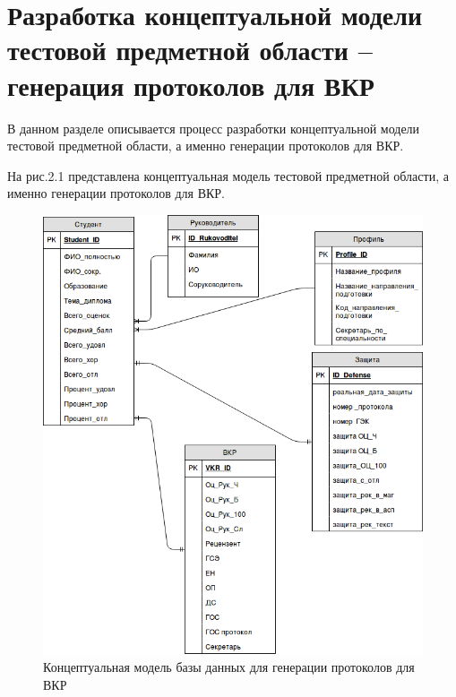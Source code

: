 \chapter{Разработка концептуальной модели тестовой предметной области – генерация протоколов для ВКР}
\label{chapter2}

В данном разделе описывается процесс разработки концептуальной модели тестовой предметной области, а именно генерации протоколов для ВКР.  

На рис.2.1 представлена концептуальная модель тестовой предметной области, а именно генерации протоколов для ВКР. \cite{ud}

\begin{figure}
	\caption{Концептуальная модель базы данных для генерации протоколов для ВКР}
	\centering
	\includegraphics[width=\textwidth]{./ERUIRzima2.png}
\end{figure}
